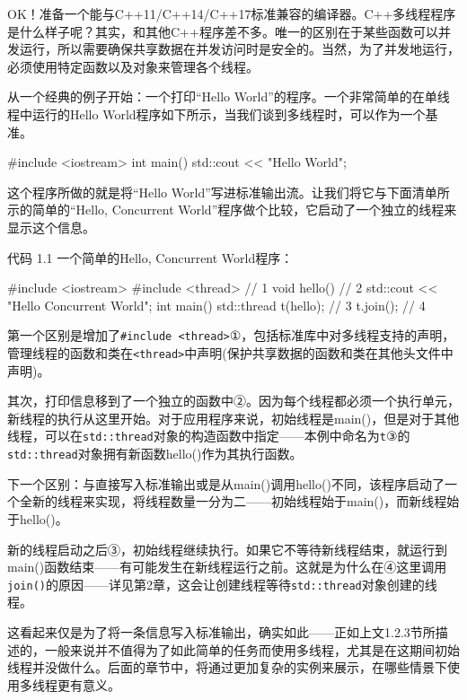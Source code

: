 
OK！准备一个能与C++11/C++14/C++17标准兼容的编译器。C++多线程程序是什么样子呢？其实，和其他C++程序差不多。唯一的区别在于某些函数可以并发运行，所以需要确保共享数据在并发访问时是安全的。当然，为了并发地运行，必须使用特定函数以及对象来管理各个线程。


从一个经典的例子开始：一个打印“Hello World”的程序。一个非常简单的在单线程中运行的Hello World程序如下所示，当我们谈到多线程时，可以作为一个基准。

\begin{cpp}
#include <iostream>
int main()
{
  std::cout << "Hello World\n";
}
\end{cpp}


这个程序所做的就是将“Hello World”写进标准输出流。让我们将它与下面清单所示的简单的“Hello, Concurrent World”程序做个比较，它启动了一个独立的线程来显示这个信息。

代码 1.1  一个简单的Hello, Concurrent World程序：

\begin{cpp}
#include <iostream>
#include <thread>  // 1
void hello()  // 2
{
  std::cout << "Hello Concurrent World\n";
}
int main()
{
  std::thread t(hello);  // 3
  t.join();  // 4
}
\end{cpp}

第一个区别是增加了\texttt{\#include <thread>}①，包括标准库中对多线程支持的声明，管理线程的函数和类在\texttt{<thread>}中声明(保护共享数据的函数和类在其他头文件中声明)。

其次，打印信息移到了一个独立的函数中②。因为每个线程都必须一个执行单元，新线程的执行从这里开始。对于应用程序来说，初始线程是main()，但是对于其他线程，可以在\texttt{std::thread}对象的构造函数中指定——本例中命名为\texttt{t}③的\texttt{std::thread}对象拥有新函数hello()作为其执行函数。

下一个区别：与直接写入标准输出或是从main()调用hello()不同，该程序启动了一个全新的线程来实现，将线程数量一分为二——初始线程始于main()，而新线程始于hello()。

新的线程启动之后③，初始线程继续执行。如果它不等待新线程结束，就运行到main()函数结束——有可能发生在新线程运行之前。这就是为什么在④这里调用\texttt{join()}的原因——详见第2章，这会让创建线程等待\texttt{std::thread}对象创建的线程。

这看起来仅是为了将一条信息写入标准输出，确实如此——正如上文1.2.3节所描述的，一般来说并不值得为了如此简单的任务而使用多线程，尤其是在这期间初始线程并没做什么。后面的章节中，将通过更加复杂的实例来展示，在哪些情景下使用多线程更有意义。

